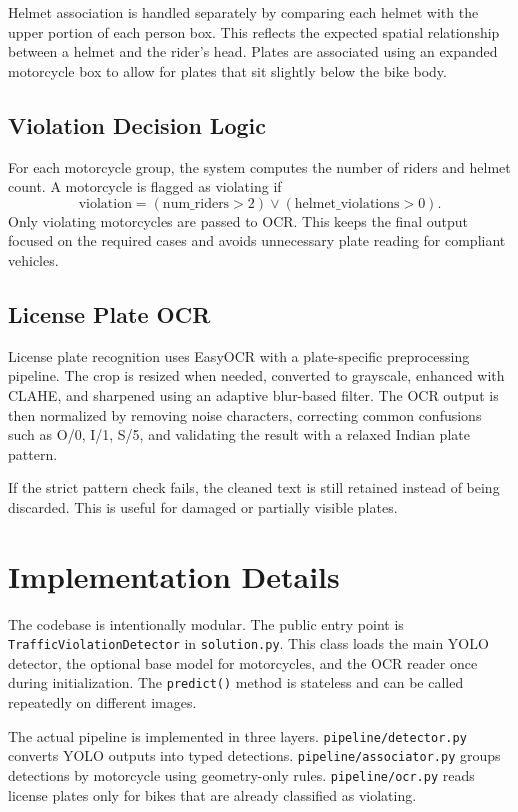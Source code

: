 \documentclass[conference]{IEEEtran}
\begin{document}
Helmet association is handled separately by comparing each helmet with the upper portion of each person box. This reflects the expected spatial relationship between a helmet and the rider's head. Plates are associated using an expanded motorcycle box to allow for plates that sit slightly below the bike body.

\subsection{Violation Decision Logic}
For each motorcycle group, the system computes the number of riders and helmet count. A motorcycle is flagged as violating if
\begin{equation}
\text{violation} = (\text{num\_riders} > 2) \lor (\text{helmet\_violations} > 0).
\end{equation}
Only violating motorcycles are passed to OCR. This keeps the final output focused on the required cases and avoids unnecessary plate reading for compliant vehicles.

\subsection{License Plate OCR}
License plate recognition uses EasyOCR with a plate-specific preprocessing pipeline. The crop is resized when needed, converted to grayscale, enhanced with CLAHE, and sharpened using an adaptive blur-based filter. The OCR output is then normalized by removing noise characters, correcting common confusions such as O/0, I/1, S/5, and validating the result with a relaxed Indian plate pattern.

If the strict pattern check fails, the cleaned text is still retained instead of being discarded. This is useful for damaged or partially visible plates.

\section{Implementation Details}
The codebase is intentionally modular. The public entry point is \texttt{TrafficViolationDetector} in \texttt{solution.py}. This class loads the main YOLO detector, the optional base model for motorcycles, and the OCR reader once during initialization. The \texttt{predict()} method is stateless and can be called repeatedly on different images.

The actual pipeline is implemented in three layers. \texttt{pipeline/detector.py} converts YOLO outputs into typed detections. \texttt{pipeline/associator.py} groups detections by motorcycle using geometry-only rules. \texttt{pipeline/ocr.py} reads license plates only for bikes that are already classified as violating.
\end{document}
